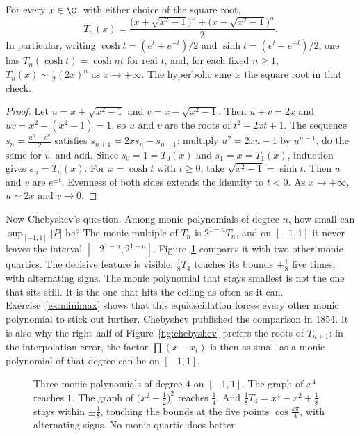\begin{propositionx}
For every $x\in\C$, with either choice of the square root,
\[
T_n(x)=\frac{\bigl(x+\sqrt{x^2-1}\bigr)^n+\bigl(x-\sqrt{x^2-1}\bigr)^n}2.
\]
In particular, writing $\cosh t=(e^t+e^{-t})/2$ and $\sinh t=(e^t-e^{-t})/2$, one has $T_n(\cosh t)=\cosh nt$ for real $t$, and, for each fixed $n\ge1$, $T_n(x)\sim\frac12(2x)^n$ as $x\to+\infty$. The hyperbolic sine is the square root in that check.
\end{propositionx}
\begin{proof}
Let $u=x+\sqrt{x^2-1}$ and $v=x-\sqrt{x^2-1}$. Then $u+v=2x$ and $uv=x^2-(x^2-1)=1$, so $u$ and $v$ are the roots of $t^2-2xt+1$. The sequence $s_n=\frac{u^n+v^n}2$ satisfies $s_{n+1}=2xs_n-s_{n-1}$: multiply $u^2=2xu-1$ by $u^{n-1}$, do the same for $v$, and add. Since $s_0=1=T_0(x)$ and $s_1=x=T_1(x)$, induction gives $s_n=T_n(x)$. For $x=\cosh t$ with $t\ge0$, take $\sqrt{x^2-1}=\sinh t$. Then $u$ and $v$ are $e^{\pm t}$. Evenness of both sides extends the identity to $t<0$. As $x\to+\infty$, $u\sim2x$ and $v\to0$.
\end{proof}

Now Chebyshev's question. Among monic polynomials of degree $n$, how small can $\sup_{[-1,1]}|P|$ be? The monic multiple of $T_n$ is $2^{1-n}T_n$, and on $[-1,1]$ it never leaves the interval $[-2^{1-n},2^{1-n}]$. Figure~\ref{fig:equioscillation} compares it with two other monic quartics. The decisive feature is visible: $\frac18T_4$ touches its bounds $\pm\frac18$ five times, with alternating signs. The monic polynomial that stays smallest is not the one that sits still. It is the one that hits the ceiling as often as it can. Exercise~\ref{ex:minimax} shows that this equioscillation forces every other monic polynomial to stick out further. Chebyshev published the comparison in 1854. It is also why the right half of Figure~\ref{fig:chebyshev} prefers the roots of $T_{n+1}$: in the interpolation error, the factor $\prod(x-x_i)$ is then as small as a monic polynomial of that degree can be on $[-1,1]$.

\begin{figure}[ht]
\centering
{}
\caption{Three monic polynomials of degree $4$ on $[-1,1]$. The graph of $x^4$ reaches $1$. The graph of $\bigl(x^2-\frac12\bigr)^2$ reaches $\frac14$. And $\frac18T_4=x^4-x^2+\frac18$ stays within $\pm\frac18$, touching the bounds at the five points $\cos\frac{k\pi}4$, with alternating signs. No monic quartic does better.}
\label{fig:equioscillation}
\end{figure}

